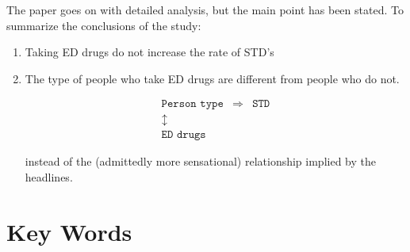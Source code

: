 \documentclass[11pt, chapterprefix=true]{scrbook}\usepackage[]{graphicx}\usepackage[]{color}
\begin{document}
The paper goes on with detailed analysis, but the main point has been stated.  To summarize the conclusions of the study:

\begin{enumerate}
	\item Taking ED drugs do not increase the rate of STD's
	\item The type of people who take ED drugs are different from people who do not.

	\begin{eqnarray*}
\texttt{Person type} & \Rightarrow & \texttt{STD} \\
\updownarrow &  & \\
\texttt{ED drugs} & &
\end{eqnarray*}

instead of the (admittedly more sensational) relationship implied by the headlines.

\end{enumerate}



\section{Key Words}

%
%
%
%
\end{document}
